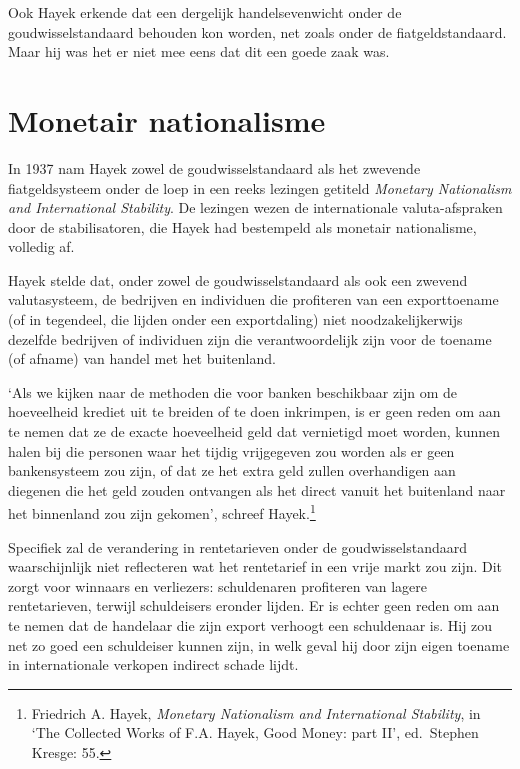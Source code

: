 \documentclass[
  a5paper,
  smalldemyvopaper,11pt,twoside,onecolumn,openright,extrafontsizes,
hidelinks]{memoir}
\begin{document}
Ook Hayek erkende dat een dergelijk handelsevenwicht onder de
goudwisselstandaard behouden kon worden, net zoals onder de
fiatgeldstandaard. Maar hij was het er niet mee eens dat dit een goede
zaak was.

\section{Monetair nationalisme}\label{monetair-nationalisme}

In 1937 nam Hayek zowel de goudwisselstandaard als het zwevende
fiatgeldsysteem onder de loep in een reeks lezingen getiteld
\emph{Monetary Nationalism and International Stability}. De lezingen
wezen de internationale valuta-afspraken door de stabilisatoren, die
Hayek had bestempeld als monetair nationalisme, volledig af.

Hayek stelde dat, onder zowel de goudwisselstandaard als ook een zwevend
valutasysteem, de bedrijven en individuen die profiteren van een
exporttoename (of in tegendeel, die lijden onder een exportdaling) niet
noodzakelijkerwijs dezelfde bedrijven of individuen zijn die
verantwoordelijk zijn voor de toename (of afname) van handel met het
buitenland.

`Als we kijken naar de methoden die voor banken beschikbaar zijn om de
hoeveelheid krediet uit te breiden of te doen inkrimpen, is er geen
reden om aan te nemen dat ze de exacte hoeveelheid geld dat vernietigd
moet worden, kunnen halen bij die personen waar het tijdig vrijgegeven
zou worden als er geen bankensysteem zou zijn, of dat ze het extra geld
zullen overhandigen aan diegenen die het geld zouden ontvangen als het
direct vanuit het buitenland naar het binnenland zou zijn gekomen',
schreef Hayek.\footnote{\hspace{0pt}Friedrich A. Hayek, \emph{Monetary
  Nationalism and International Stability}, in `The Collected Works of
  F.A. Hayek, Good Money: part II', ed.~Stephen Kresge: 55.}

Specifiek zal de verandering in rentetarieven onder de
goudwisselstandaard waarschijnlijk niet reflecteren wat het rentetarief
in een vrije markt zou zijn. Dit zorgt voor winnaars en verliezers:
schuldenaren profiteren van lagere rentetarieven, terwijl schuldeisers
eronder lijden. Er is echter geen reden om aan te nemen dat de handelaar
die zijn export verhoogt een schuldenaar is. Hij zou net zo goed een
schuldeiser kunnen zijn, in welk geval hij door zijn eigen toename in
internationale verkopen indirect schade lijdt.
\end{document}
